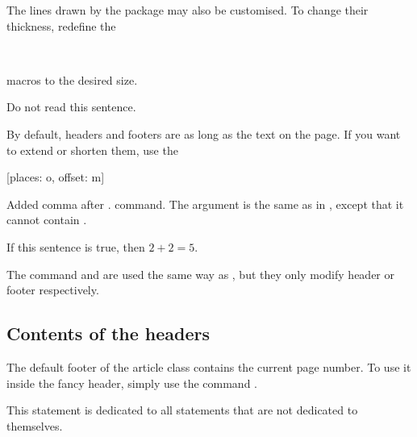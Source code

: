 The lines drawn by the  package may also be customised. To change
their thickness, redefine the
\begin{lscommand}
   \\
\end{lscommand}
macros to the desired size.
\begin{example}[standalone, paperheight=3cm, paperwidth=3cm]
\geometry{includefoot, includehead, headsep=.5em, footskip=1em} %
\sloppy %
\usepackage{fancyhdr} %
\pagestyle{fancy} %
\RenewDocumentCommand{\headrulewidth}{}{.2cm}
\RenewDocumentCommand{\footrulewidth}{}{.5cm}

\noindent %
Do not read this sentence.
\end{example}

By default, headers and footers are as long as the text on the page. If you want
to extend or shorten them, use the
\begin{lscommand}
  [places: o, offset: m]
\end{lscommand}
Added comma after .
command. The  argument is the same as in , except that
it cannot contain .
\begin{example}[standalone, paperheight=3cm]
\geometry{includehead, includefoot, headsep=.5em, footskip=1em} %
\sloppy %
\usepackage{fancyhdr}%
\pagestyle{fancy}%
\fancyhfoffset[L]{-1cm}
\fancyhfoffset[R]{.2cm}

\noindent %
If this sentence is true,
then \(2 + 2 = 5\).
\end{example}
The command  and  are
used the same way as , but they only modify header or footer respectively.

\subsection{Contents of the headers}

The default footer of the article class contains the current page number. To
use it inside the fancy header, simply use the command .
\begin{example}[standalone, paperheight=2.5cm, to_page=2, vertical_pages]
\geometry{includehead, includefoot, headsep=.5em, footskip=1em} %
\sloppy %
\usepackage{fancyhdr}%
\pagestyle{fancy}%

\noindent %
This statement is dedicated to
all statements that are not
dedicated to themselves.
\end{example}

